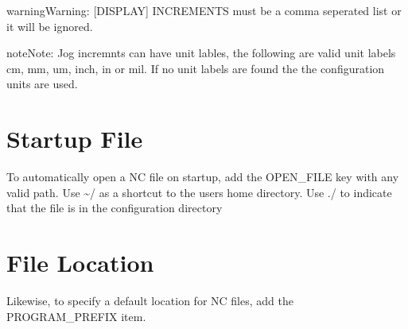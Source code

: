 \documentclass[letterpaper,10pt,english]{sphinxmanual}
\begin{document}
\begin{sphinxadmonition}{warning}{Warning:}
\sphinxAtStartPar
{[}DISPLAY{]} INCREMENTS must be a comma seperated list or it will be
ignored.
\end{sphinxadmonition}

\begin{sphinxadmonition}{note}{Note:}
\sphinxAtStartPar
Jog incremnts can have unit lables, the following are valid unit
labels cm, mm, um, inch, in or mil. If no unit labels are found the the
configuration units are used.
\end{sphinxadmonition}


\section{Startup File}
\label{\detokenize{ini:startup-file}}
\sphinxAtStartPar
To automatically open a NC file on startup, add the OPEN\_FILE key with any
valid path. Use \textasciitilde{}/ as a shortcut to the users home directory. Use ./ to indicate
that the file is in the configuration directory

\begin{sphinxVerbatim}[commandchars=\\\{\}]
    
  
        
  
         
  
           
  
\end{sphinxVerbatim}


\section{File Location}
\label{\detokenize{ini:file-location}}
\sphinxAtStartPar
Likewise, to specify a default location for NC files, add the PROGRAM\_PREFIX
item.
\end{document}
